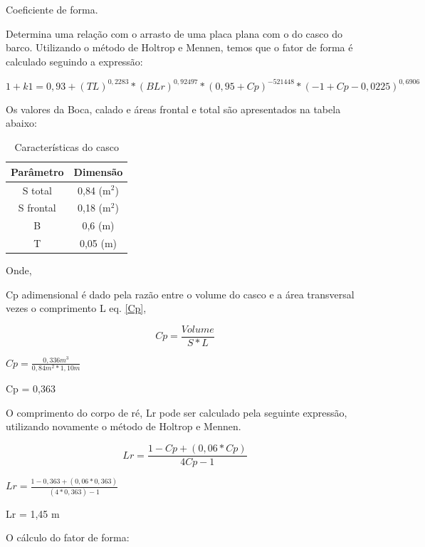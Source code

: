 Coeficiente de forma.

Determina uma relação com o arrasto de uma placa plana com o do casco do barco. Utilizando o método de Holtrop e Mennen, temos que o fator de forma é calculado seguindo a expressão: 


\begin{equation}\label{k1}

    1+k1=0,93+(TL)^{0,2283}  * (BLr)^{0,92497}  * (0,95+Cp)^{-521448}  *(-1+Cp-0,0225)^{0,6906} 
\end{equation}


Os valores da Boca, calado e áreas frontal e total são apresentados na tabela abaixo:


\begin{table}[h]
	\centering
	\label{casco}	
	\begin{tabular}{cc}
		\toprule
		\textbf{Parâmetro} & \textbf{Dimensão}  \\
		\midrule
		S total  & 0,84 (m$^{2}$)       \\
		S frontal  & 0,18 (m$^{2}$)          \\
		B  & 0,6 (m)               \\
		T  & 0,05 (m)   \\
		\bottomrule
	\end{tabular}	
	\caption{Características do casco}
\end{table}

Onde, 

Cp adimensional é dado pela razão entre o  volume do casco e a área transversal vezes o comprimento L eq. \ref{Cp},

\begin{equation} \label{Cp}
    Cp = \frac{Volume}{ S * L}
\end{equation}

    $Cp = \frac{0,336 m^{3}}{ 0,84 m^{2} * 1,10 m}$
    
    Cp = 0,363
    
O comprimento do corpo de ré, Lr pode ser calculado pela seguinte expressão, utilizando novamente o método de Holtrop e Mennen.

\begin{equation} \label{Lr}
    Lr = \frac{1 - Cp + (0,06 * Cp)}{4Cp - 1} 
\end{equation}

   $Lr = \frac{1 -0,363 + (0,06*0,363)}{(4*0,363) - 1} $
   
   Lr = 1,45 m

O cálculo do fator de forma:


